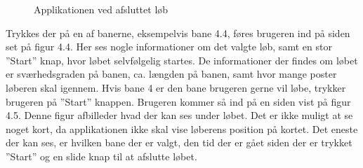 \begin{figure}
\begin{minipage}{.5\textwidth}
		\caption{Applikationen ved afsluttet løb}
		\label{fig:test2}
	\end{minipage}
\end{figure}

Trykkes der på en af banerne, eksempelvis bane 4.4, føres brugeren ind på siden set på figur 4.4. Her ses nogle informationer om det valgte løb, samt en stor ”Start” knap, hvor løbet selvfølgelig startes. De informationer der findes om løbet er sværhedsgraden på banen, ca. længden på banen, samt hvor mange poster løberen skal igennem. Hvis bane 4 er den bane brugeren gerne vil løbe, trykker brugeren på ”Start” knappen. Brugeren kommer så ind på en siden vist på figur 4.5. Denne figur afbilleder hvad der kan ses under løbet. Det er ikke muligt at se noget kort, da applikationen ikke skal vise løberens position på kortet. Det eneste der kan ses, er hvilken bane der er valgt, den tid der er gået siden der er trykket ”Start” og en slide knap til at afslutte løbet.
